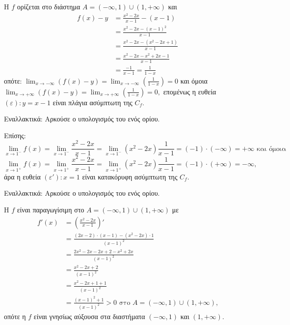 \begin{Lysh}
    \begin{alist}
        \item [α)] Η $f$ ορίζεται στο διάστημα $A = (-\infty, 1) \cup (1, +\infty)$ και
        \begin{align*}
            f(x)-y &= \frac{x^2-2x}{x-1}-(x-1) \\
            &= \frac{x^2-2x-(x-1)^2}{x-1} \\
            &= \frac{x^2-2x-(x^2-2x+1)}{x-1} \\
            &= \frac{x^2-2x-x^2+2x-1}{x-1} \\
            &= \frac{-1}{x-1} = \frac{1}{1-x}
        \end{align*}
        οπότε: $\lim_{x\to -\infty} (f(x)-y) = \lim_{x\to -\infty} \left(\frac{1}{1-x}\right) = 0$ και όμοια $\lim_{x\to +\infty} (f(x)-y) = \lim_{x\to +\infty} \left(\frac{1}{1-x}\right) = 0,$
        επομένως η ευθεία $(\varepsilon): y = x-1$ είναι πλάγια ασύμπτωτη της $C_f$.

        Εναλλακτικά: Αρκούσε ο υπολογισμός του ενός ορίου.

        \item [β)] Επίσης:
        \[
        \lim_{x\to 1^-} f(x) = \lim_{x\to 1^-} \frac{x^2-2x}{x-1} = \lim_{x\to 1^-} (x^2-2x) \frac{1}{x-1} = (-1) \cdot (-\infty) = +\infty \text{ και όμοια}
        \]
        \[
        \lim_{x\to 1^+} f(x) = \lim_{x\to 1^+} \frac{x^2-2x}{x-1} = \lim_{x\to 1^+} (x^2-2x) \frac{1}{x-1} = (-1) \cdot (+\infty) = -\infty,
        \]
        άρα η ευθεία $(\varepsilon'): x=1$ είναι κατακόρυφη ασύμπτωτη της $C_f$.

        Εναλλακτικά: Αρκούσε ο υπολογισμός του ενός ορίου.

        \item [γ)] Η $f$ είναι παραγωγίσιμη στο $A = (-\infty, 1) \cup (1, +\infty)$ με
        \begin{align*}
            f'(x)&=\left(\frac{x^2-2x}{x-1}\right)' \\
            &= \frac{(2x-2)\cdot(x-1)-(x^2-2x)\cdot 1}{(x-1)^2} \\
            &= \frac{2x^2-2x-2x+2-x^2+2x}{(x-1)^2} \\
            &= \frac{x^2-2x+2}{(x-1)^2} \\
            &= \frac{x^2-2x+1+1}{(x-1)^2} \\
            &= \frac{(x-1)^2+1}{(x-1)^2} > 0 \text{ στο } A=(-\infty, 1) \cup (1, +\infty)\text{,}
        \end{align*}
        οπότε η $f$ είναι γνησίως αύξουσα στα διαστήματα $(-\infty, 1)$ και $(1, +\infty)$.
    \end{alist}
\end{Lysh}